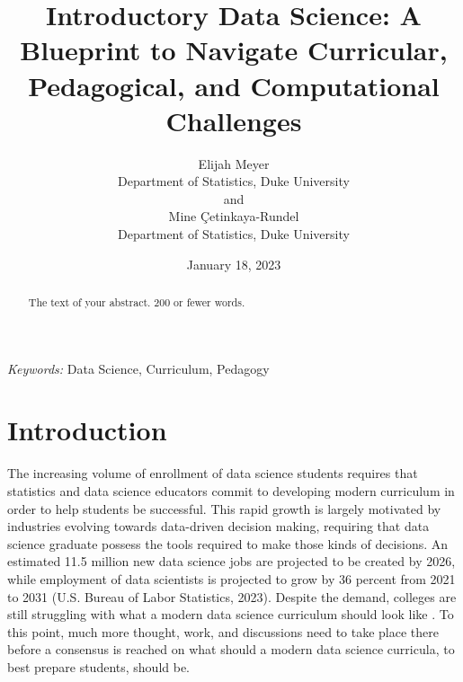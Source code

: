 \documentclass[
  12pt]{article}
\begin{document}
\def\spacingset#1{\renewcommand{\baselinestretch}%
{#1}\small\normalsize} \spacingset{1}



\date{January 18, 2023}
\title{\bf Introductory Data Science: A Blueprint to Navigate
Curricular, Pedagogical, and Computational Challenges}
\author{
Elijah Meyer\\
Department of Statistics, Duke University\\
and\\Mine Çetinkaya-Rundel\\
Department of Statistics, Duke University\\
}
\maketitle

\bigskip
\bigskip
\begin{abstract}
The text of your abstract. 200 or fewer words.
\end{abstract}

\noindent%
{\it Keywords:} Data Science, Curriculum, Pedagogy
\vfill

\newpage
\spacingset{1.9} %
\ifdefined\Shaded\renewenvironment{Shaded}{\begin{tcolorbox}[interior hidden, borderline west={3pt}{0pt}{shadecolor}, enhanced, sharp corners, frame hidden, breakable, boxrule=0pt]}{\end{tcolorbox}}\fi

\hypertarget{sec-intro}{%
\section{Introduction}\label{sec-intro}}

The increasing volume of enrollment of data science students
\citep{Redmond2022} requires that statistics and data science educators
commit to developing modern curriculum in order to help students be
successful. This rapid growth is largely motivated by industries
evolving towards data-driven decision making, requiring that data
science graduate possess the tools required to make those kinds of
decisions. An estimated 11.5 million new data science jobs are projected
to be created by 2026, while employment of data scientists is projected
to grow by 36 percent from 2021 to 2031 (U.S. Bureau of Labor
Statistics, 2023). Despite the demand, colleges are still struggling
with what a modern data science curriculum should look like
\citep{Schwab2020}. To this point, much more thought, work, and
discussions need to take place there before a consensus is reached on
what should a modern data science curricula, to best prepare students,
should be.
\end{document}
